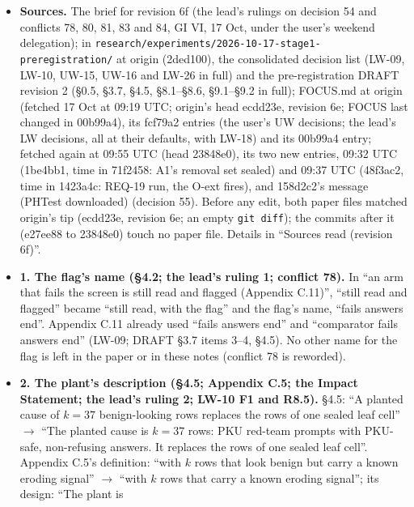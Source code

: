 \documentclass{article}
\theoremstyle{plain}
\theoremstyle{definition}
\theoremstyle{remark}
\begin{document}
\begin{itemize}
  \item \textbf{Sources.} The brief for revision 6f (the lead's rulings on
        decision 54 and conflicts 78, 80, 81, 83 and 84, GI VI, 17 Oct, under
        the user's weekend delegation); in
        \nolinkurl{research/experiments/2026-10-17-stage1-preregistration/} at
        origin (2ded100), the consolidated decision list (LW-09, LW-10, UW-15,
        UW-16 and LW-26 in full) and the pre-registration DRAFT revision 2
        (\S{}0.5, \S{}3.7, \S{}4.5, \S{}8.1--\S{}8.6, \S{}9.1--\S{}9.2 in full);
        FOCUS.md at origin (fetched 17 Oct at 09:19 UTC; origin's head ecdd23e,
        revision 6e; FOCUS last changed in 00b99a4), its fcf79a2 entries (the
        user's UW decisions; the lead's LW decisions, all at their defaults,
        with LW-18) and its 00b99a4 entry; fetched again at 09:55 UTC (head
        23848e0), its two new entries, 09:32 UTC (1be4bb1, time in 71f2458: A1's
        removal set sealed) and 09:37 UTC (48f3ac2, time in 1423a4c: REQ-19 run,
        the O-ext fires), and 158d2c2's message (PHTest downloaded) (decision
        55). Before any edit, both paper files matched origin's tip (ecdd23e,
        revision 6e; an empty \texttt{git diff}); the commits after it (e27ee88
        to 23848e0) touch no paper file. Details in ``Sources read (revision
        6f)''.
  \item \textbf{1. The flag's name (\S{}4.2; the lead's ruling 1; conflict 78).}
        In ``an arm that fails the screen is still read and flagged (Appendix
        C.11)'', ``still read and flagged'' became ``still read, with the flag''
        and the flag's name, ``fails answers end''. Appendix C.11 already used
        ``fails answers end'' and ``comparator fails answers end'' (LW-09; DRAFT
        \S{}3.7 items 3--4, \S{}4.5). No other name for the flag is left in the
        paper or in these notes (conflict 78 is reworded).
  \item \textbf{2. The plant's description (\S{}4.5; Appendix C.5; the Impact
        Statement; the lead's ruling 2; LW-10 F1 and R8.5).} \S{}4.5: ``A
        planted cause of $k = 37$ benign-looking rows replaces the rows of one
        sealed leaf cell'' $\to$ ``The planted cause is $k = 37$ rows: PKU
        red-team prompts with PKU-safe, non-refusing answers. It replaces the
        rows of one sealed leaf cell''. Appendix C.5's definition: ``with $k$
        rows that look benign but carry a known eroding signal'' $\to$ ``with
        $k$ rows that carry a known eroding signal''; its design: ``The plant is

\end{itemize}
\end{document}
